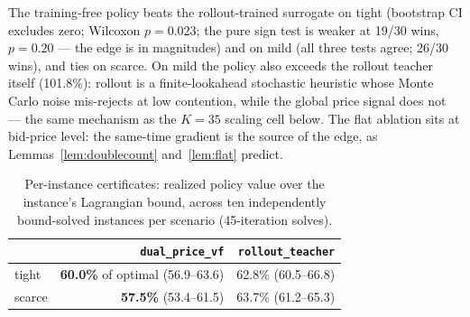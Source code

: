 \documentclass[11pt]{article}
\begin{document}
\begin{table}[t]
\centering
\caption{Retention vs the rollout teacher over thirty held-out seed
pairs. The last rows give the paired difference of the zero-label dual
policy against the rollout-trained surrogate, and mean per-decision
latency.}
\label{tab:headline}
\small
{}
\end{table}

The training-free policy beats the rollout-trained surrogate on tight
(bootstrap CI excludes zero; Wilcoxon $p = 0.023$; the pure sign test is
weaker at 19/30 wins, $p = 0.20$ --- the edge is in magnitudes) and on
mild (all three tests agree; 26/30 wins), and ties on scarce. On mild
the policy also exceeds the rollout teacher itself (101.8\%): rollout
is a finite-lookahead stochastic heuristic whose Monte Carlo noise
mis-rejects at low contention, while the global price signal does not
--- the same mechanism as the $K{=}35$ scaling cell below. The flat
ablation sits at bid-price level: the same-time gradient is the source
of the edge, as Lemmas~\ref{lem:doublecount} and~\ref{lem:flat} predict.

\begin{table}[t]
\centering
\caption{Per-instance certificates: realized policy value over the
instance's Lagrangian bound, across ten independently bound-solved
instances per scenario (45-iteration solves).}
\label{tab:certs}
\small
\begin{tabular}{lrr}
\toprule
 & \texttt{dual\_price\_vf} & \texttt{rollout\_teacher} \\
\midrule
tight & \textbf{60.0\%} of optimal (56.9--63.6) & 62.8\% (60.5--66.8) \\
scarce & \textbf{57.5\%} (53.4--61.5) & 63.7\% (61.2--65.3) \\
\bottomrule
\end{tabular}
\end{table}
\end{document}
